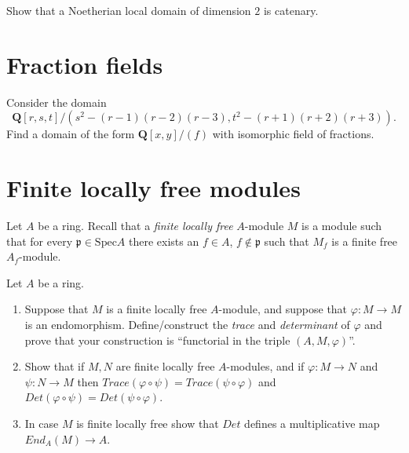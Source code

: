 \begin{exercise}
Show that a Noetherian local domain of dimension $2$ is catenary.
\end{exercise}




\section{Fraction fields}
\label{section-fraction-fields}

\begin{exercise}
Consider the domain
$$
{\mathbf Q}[r,s,t]/(s^2-(r-1)(r-2)(r-3), t^2-(r+1)(r+2)(r+3)).
$$
Find a domain of the form ${\mathbf Q}[x,y]/(f)$ with isomorphic
field of fractions.
\end{exercise}




\section{Finite locally free modules}
\label{section-finite-locally-free}

\begin{definition}
Let $A$ be a ring. Recall that a {\it finite locally free} $A$-module
$M$ is a module such that for every ${\mathfrak p} \in \text{Spec} A$
there exists an
$f\in A$, $f \not \in {\mathfrak p}$ such that $M_f$ is a finite free
$A_f$-module.
\end{definition}

\begin{exercise}
Let $A$ be a ring.
\begin{enumerate}
\item Suppose that $M$ is a finite locally free $A$-module, and
suppose that $\varphi : M \to M$ is an endomorphism. Define/construct
the {\it trace}  and {\it determinant} of $\varphi$ and prove that your
construction is ``functorial in the triple $(A,M,\varphi)$''.
\item Show that if $M,N$ are finite locally free $A$-modules,
and if $\varphi : M \to N$ and $\psi : N \to M$ then
$Trace(\varphi \circ \psi) = Trace(\psi \circ \varphi)$ and
$Det(\varphi \circ \psi) = Det(\psi \circ \varphi)$.
\item In case $M$ is finite locally free show that
$Det$ defines a multiplicative map $End_A(M) \to A$.
\end{enumerate}
\end{exercise}

